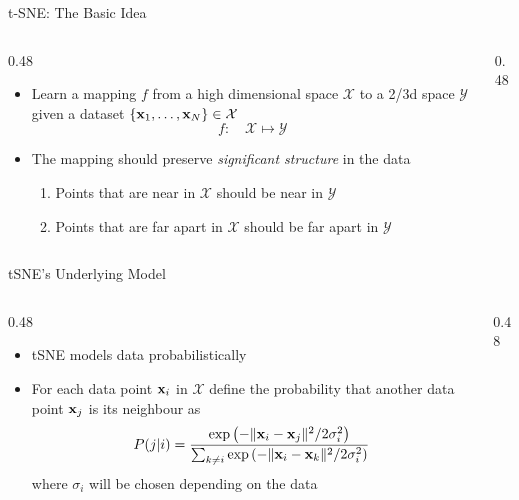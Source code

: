 \documentclass[aspectratio=169]{beamer}
\begin{document}
\begin{frame}{t-SNE: The Basic Idea}
  \begin{columns}[T]
    \begin{column}{0.48\textwidth}
      \begin{itemize}
        \item Learn a mapping $f$ from a high dimensional space $\mathcal{X}$ to a 2/3d space $\mathcal{Y}$ given a dataset $\{\mathbf{x}_1,\dots,\mathbf{x}_N\}\in\mathcal{X}$
        \begin{equation*}
          f:\quad \mathcal{X}\mapsto\mathcal{Y}
        \end{equation*}
        \pause
        \item The mapping should preserve \textit{significant structure} in the data
        \begin{enumerate}
          \item Points that are near in $\mathcal{X}$ should be near in $\mathcal{Y}$
          \item Points that are far apart in $\mathcal{X}$ should be far apart in $\mathcal{Y}$
        \end{enumerate}
      \end{itemize}
    \end{column}
    \begin{column}{0.48\textwidth}
    \end{column}
  \end{columns}
\end{frame}

\begin{frame}{tSNE's Underlying Model}
  \begin{columns}[T]
    \begin{column}{0.48\textwidth}
      \begin{itemize}
        \item tSNE models data probabilistically
        \item For each data point $\mathbf{x}_i$ in  $\mathcal{X}$ define the probability that another data point $\mathbf{x}_j$ is its neighbour as 
        \begin{equation*}
          P(j\vert i) = \frac{\exp\left(-\|\mathbf{x}_i-\mathbf{x}_j\|^2/2\sigma_i^2\right)}{\sum_{k\ne i}\exp\left(-\|\mathbf{x}_i-\mathbf{x}_k\|^2/2\sigma_i^2\right)}
        \end{equation*}
        where $\sigma_i$ will be chosen depending on the data
      \end{itemize}
    \end{column}
    \begin{column}{0.48\textwidth}
    \end{column}
  \end{columns}
\end{frame}
\end{document}
